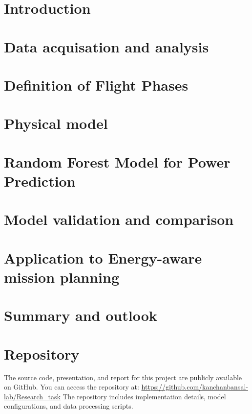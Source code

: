 \documentclass[conference, letter]{IEEEtran}
\begin{document}
\section{Introduction}


\section{Data acquisation and analysis}
\label{data_analysis}

% 

\section{Definition of Flight Phases}
\label{flight_phases}


\section{Physical model}
\label{Physic_model}


\section{Random Forest Model for Power Prediction}
\label{data_driven}


\section{Model validation and comparison}
\label{task_04}


\section{Application to Energy-aware mission planning}
\label{task_05}


\section{Summary and outlook}


\section*{Repository}
The source code, presentation, and report for this project are publicly available on GitHub. You can access the repository at:
\href{https://github.com/kanchanbansal-lab/Research_task}{https://github.com/kanchanbansal-lab/Research\_task}
The repository includes implementation details, model configurations, and data processing scripts.
\end{document}
